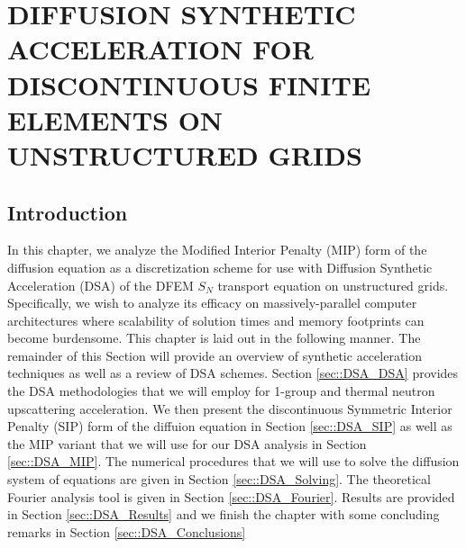 %
%
%
\chapter{\uppercase {Diffusion Synthetic Acceleration for Discontinuous Finite Elements on Unstructured Grids}}
\label{sec::DSA}

\section{Introduction}
\label{sec::DSA_Introduction}

In this chapter, we analyze the Modified Interior Penalty (MIP) form of the diffusion equation as a discretization scheme for use with Diffusion Synthetic Acceleration (DSA) of the DFEM $S_N$ transport equation on unstructured grids. Specifically, we wish to analyze its efficacy on massively-parallel computer architectures where scalability of solution times and memory footprints can become burdensome. This chapter is laid out in the following manner. The remainder of this Section will provide an overview of synthetic acceleration techniques as well as a review of DSA schemes. Section \ref{sec::DSA_DSA} provides the DSA methodologies that we will employ for 1-group and thermal neutron upscattering acceleration. We then present the discontinuous Symmetric Interior Penalty (SIP) form of the diffuion equation in Section \ref{sec::DSA_SIP} as well as the MIP variant that we will use for our DSA analysis in Section \ref{sec::DSA_MIP}. The numerical procedures that we will use to solve the diffusion system of equations are given in Section \ref{sec::DSA_Solving}. The theoretical Fourier analysis tool is given in Section \ref{sec::DSA_Fourier}. Results are provided in Section \ref{sec::DSA_Results} and we finish the chapter with some concluding remarks in Section \ref{sec::DSA_Conclusions}

